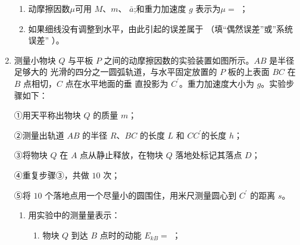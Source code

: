 \begin{enumerate}
\begin{enumerate}
\item 
动摩擦因数$ \mu $可用 $ M $、$ m $、 $ \bar{a} $;和重力加速度 $ g $ 表示为$ \mu = $  ；

\item 
如果细线没有调整到水平，由此引起的误差属于
（填“偶然误差”或”系统误差” ）。



\end{enumerate}




\newpage
\item
{}
测量小物块 $ Q $ 与平板 $ P $ 之间的动摩擦因数的实验装置如图所示。$ AB $ 是半径足够大的
光滑的四分之一圆弧轨道，与水平固定放置的 $ P $ 板的上表面 $ BC $ 在 $ B $ 点相切，$ C $ 点在水平地面的垂
直投影为 $ C ^{\prime} $。重力加速度大小为 $ g $。实验步骤如下：


①用天平称出物块 $ Q $ 的质量 $ m $；

②测量出轨道 $ AB $ 的半径 $ R $、$ BC $ 的长度 $ L $ 和 $ CC ^{\prime} $的长度 $ h $；


③将物块 $ Q $ 在 $ A $ 点从静止释放，在物块 $ Q $ 落地处标记其落点 $ D $；





④重复步骤③，共做 $ 10 $ 次；

⑤将 $ 10 $ 个落地点用一个尽量小的圆围住，用米尺测量圆心到 $ C ^{\prime} $ 的距离 $ s $。
\begin{figure}[h!]
\centering

\end{figure}

\begin{enumerate}
\renewcommand{\labelenumi}{\arabic{enumi}.}
\item
用实验中的测量量表示：
\begin{enumerate}
\renewcommand{\labelenumiii}{\roman{enumiii}.}
\item
物块 $ Q $ 到达 $ B $ 点时的动能 $ E_{kB} = $
；


\end{enumerate}
\end{enumerate}
\end{enumerate}
